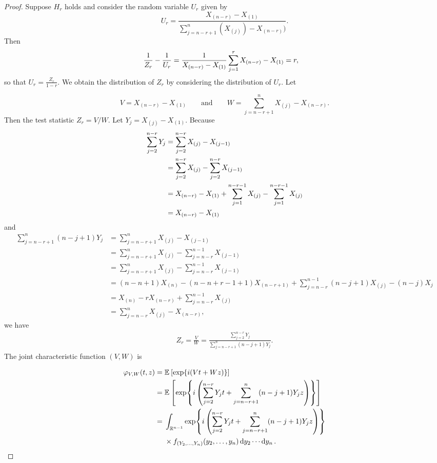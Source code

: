 \documentclass{report}
\begin{document}
\begin{proof}
    Suppose $H_r$ holds and consider the random variable $U_r$ given by
    \[ 
        U_r = \frac{X_{(n-r)} - X_{(1)}}{\sum_{j=n-r+1}^n (X_{(j)}) - X_{(n-r)})}.
    \]
    Then
    \begin{align} \label{eqn: relation between Zr and Ur}
        \frac{1}{Z_r} - \frac{1}{U_r} &= \frac{1}{X_{(n-r)} - X_{(1)}}\sumj{r} X_{(n-r)} - X_{(1)} = r ,
    \end{align}
    so that $U_r = \frac{Z_r}{1-r}$. We obtain the distribution of $Z_r$ by considering the distribution of $U_r$. Let

    \[ 
        V = X_{(n-r)} - X_{(1)} \qquad \text{and} \qquad W = \sum_{j=n-r+1}^n X_{(j)} - X_{(n-r)}.
    \]
    Then the test statistic $Z_r = V/W$. Let $Y_j = X_{(j)} - X_{(1)}$. Because
    \begin{align*}
        \sumj[2]{n-r} Y_j &= \sumj[2]{n-r} X_{(j)} - X_{(j-1)}
        \\
        &= \sumj[2]{n-r} X_{(j)} - \sumj[2]{n-r} X_{(j-1)}
        \\
        &= X_{(n-r)} - X_{(1)} + \sumj[1]{n-r-1} X_{(j)} - \sumj[1]{n-r-1} X_{(j)}
        \\
        &= X_{(n-r)} - X_{(1)}
    \end{align*}
    and
    \begin{align*}
        \sum_{j = n-r+1}^n (n-j+1)Y_j &= \sum_{j = n-r+1}^n  X_{(j)} - X_{(j-1)}
        \\
        &= \sum_{j = n-r+1}^n  X_{(j)} - \sum_{j = n-r}^{n-1}  X_{(j-1)}
        \\
        &= \sum_{j = n-r+1}^n  X_{(j)} - \sum_{j = n-r}^{n-1}  X_{(j-1)}
        \\
        &= (n-n+1)X_{(n)} -(n-n+r-1+1) X_{(n-r+1)} + \sum_{j = n-r}^{n-1}  (n-j+1)X_{(j)} - (n-j)X_{j}
        \\
        &= X_{(n)} - rX_{(n-r)} + \sum_{j=n-r}^{n-1} X_{(j)}
        \\
        &= \sum_{j=n-r}^n X_{(j)} - X_{(n-r)},
    \end{align*}
    we have
   \begin{align} \label{eqn : Z_r in terms of Y}
    Z_r = \frac{V}{W} = \frac{\sum_{j=2}^{n-r} Y_j}{\sum_{j=n-r+1}^n (n-j+1)Y_j}.
   \end{align}
    The joint characteristic function $(V,W)$ is

    \begin{align*}
        \varphi_{V,W}(t,z) &= \E{ \exp{i(Vt + Wz)}} \\
        &= \E{ \exp{i\left( \sumj[2]{n-r} Y_j t + \sum_{j=n-r+1}^n (n-j+1)Y_jz\right)}}
        \\
        &=\begin{aligned}[t]
            &\int_{\RR^{n-1}} \exp{i\left( \sumj[2]{n-r} Y_j t + \sum_{j=n-r+1}^n (n-j+1)Y_jz\right)}
            \\
            &\times f_{(Y_2,\ldots,Y_n)}(y_2,\ldots,y_n) \dd{y_2}\cdots\dd{y_n}.
        \end{aligned} \\
   \end{align*}


\end{proof}
\end{document}
